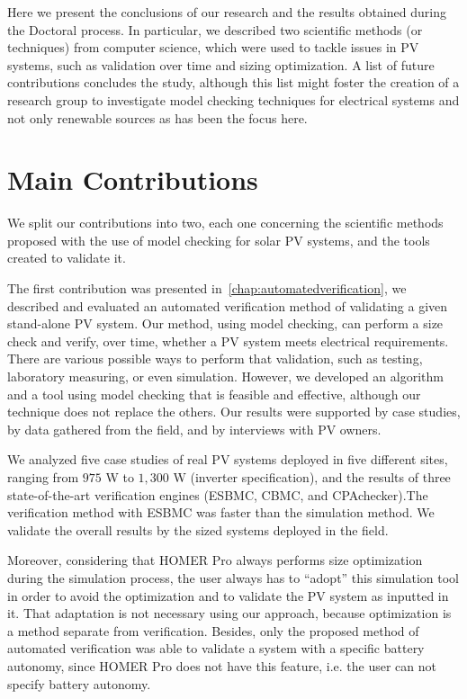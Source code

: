 Here we present the conclusions of our research and the results obtained during the Doctoral process. In particular, we described two scientific methods (or techniques) from computer science, which were used to tackle issues in PV systems, such as validation over time and sizing optimization. A list of future contributions concludes the study, although this list might foster the creation of a research group to investigate model checking techniques for electrical systems and not only renewable sources as has been the focus here.

\section{Main Contributions}

We split our contributions into two, each one concerning the scientific methods proposed with the use of model checking for solar PV systems, and the tools created to validate it.

The first contribution was presented in~\autoref{chap:automatedverification}, we described and evaluated an automated verification method of validating a given stand-alone PV system. Our method, using model checking, can perform a size check and verify, over time, whether a PV system meets electrical requirements. There are various possible ways to perform that validation, such as testing, laboratory measuring, or even simulation. However, we developed an algorithm and a tool using model checking that is feasible and effective, although our technique does not replace the others. Our results were supported by case studies, by data gathered from the field, and by interviews with PV owners.

We analyzed five case studies of real PV systems deployed in five different sites, ranging from $975$ W to $1,300$ W (inverter specification), and the results of three state-of-the-art verification engines (ESBMC, CBMC, and CPAchecker).The verification method with ESBMC was faster than the simulation method. We validate the overall results by the sized systems deployed in the field.

Moreover, considering that HOMER Pro always performs size optimization during the simulation process, the user always has to ``adopt'' this simulation tool in order to avoid the optimization and to validate the PV system as inputted in it. That adaptation is not necessary using our approach, because optimization is a method separate from verification. Besides, only the proposed method of automated verification was able to validate a system with a specific battery autonomy, since HOMER Pro does not have this feature, i.e. the user can not specify battery autonomy.

